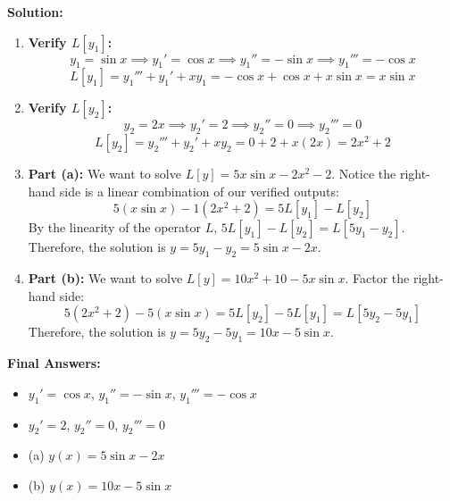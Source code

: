 \documentclass[11pt, a4paper]{article}
\theoremstyle{definition}
\theoremstyle{remark}
\begin{document}
\textbf{Solution:}
\begin{enumerate}
    \item \textbf{Verify $L[y_1]$:}
    \[ y_1 = \sin x \implies y_1' = \cos x \implies y_1'' = -\sin x \implies y_1''' = -\cos x \]
    \[ L[y_1] = y_1''' + y_1' + x y_1 = -\cos x + \cos x + x\sin x = x\sin x \]
    \item \textbf{Verify $L[y_2]$:}
    \[ y_2 = 2x \implies y_2' = 2 \implies y_2'' = 0 \implies y_2''' = 0 \]
    \[ L[y_2] = y_2''' + y_2' + x y_2 = 0 + 2 + x(2x) = 2x^2 + 2 \]
    \item \textbf{Part (a):} We want to solve $L[y] = 5x\sin x - 2x^2 - 2$.
    Notice the right-hand side is a linear combination of our verified outputs:
    \[ 5(x\sin x) - 1(2x^2 + 2) = 5 L[y_1] - L[y_2] \]
    By the linearity of the operator $L$, $5 L[y_1] - L[y_2] = L[5y_1 - y_2]$.
    Therefore, the solution is $y = 5y_1 - y_2 = 5\sin x - 2x$.
    \item \textbf{Part (b):} We want to solve $L[y] = 10x^2 + 10 - 5x\sin x$.
    Factor the right-hand side:
    \[ 5(2x^2 + 2) - 5(x\sin x) = 5 L[y_2] - 5 L[y_1] = L[5y_2 - 5y_1] \]
    Therefore, the solution is $y = 5y_2 - 5y_1 = 10x - 5\sin x$.
\end{enumerate}

\begin{center}
\end{center}

\textbf{Final Answers:}
\begin{itemize}
    \item $y_1' = \cos x$, $y_1'' = -\sin x$, $y_1''' = -\cos x$
    \item $y_2' = 2$, $y_2'' = 0$, $y_2''' = 0$
    \item (a) $y(x) = 5\sin x - 2x$
    \item (b) $y(x) = 10x - 5\sin x$
\end{itemize}
\end{document}
